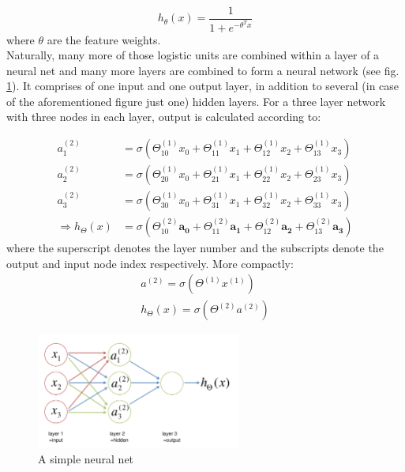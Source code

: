 \documentclass[a4paper, 12pt]{article}
\numberwithin{equation}{section}
\begin{document}
	\begin{equation}
	h_\theta (x) = \frac{1}{1+e^{-\theta ^ T x}}
	\end{equation}
	where $\theta$ are the feature weights.\\
	
	Naturally, many more of those logistic units are combined within a layer of a neural net and many more layers are combined to form a neural network (see fig. \ref{fig:neural_net}). It comprises of one input and one output layer, in addition to several (in case of the aforementioned figure just one) hidden layers. For a three layer network with three nodes in each layer, output is calculated according to:
	
	\begin{align}
	a_1^{(2)} &= \sigma (\Theta_{10}^{(1)} x_0 + \Theta_{11}^{(1)} x_1  + \Theta_{12}^{(1)} x_2  + \Theta_{13}^{(1)} x_3) \\
	a_2^{(2)} &= \sigma (\Theta_{20}^{(1)} x_0 + \Theta_{21}^{(1)} x_1  + \Theta_{22}^{(1)} x_2  + \Theta_{23}^{(1)} x_3) \\
	a_3^{(2)} &= \sigma (\Theta_{30}^{(1)} x_0 + \Theta_{31}^{(1)} x_1  + \Theta_{32}^{(1)} x_2  + \Theta_{33}^{(1)} x_3) \\
	\Rightarrow h_{\Theta} (x) &= \sigma (\Theta_{10}^{(2)} \boldsymbol{a_0} + \Theta_{11}^{(2)} \boldsymbol{a_1}  + \Theta_{12}^{(2)} \boldsymbol{a_2}  + \Theta_{13}^{(2)} \boldsymbol{a_3})
	\end{align}
	where the superscript denotes the layer number and the subscripts denote the output and input node index respectively. More compactly:
	\begin{align}
	a^{(2)} = \sigma(\Theta^{(1)} x^{(1)}) \\
	h_{\Theta}(x) = \sigma(\Theta^{(2)} a^{(2)})
	\end{align}
	
	\begin{figure}[!h]
		\centering
		\includegraphics[page=1,width=0.60\textwidth]{neural_net.pdf}
		\caption{\label{fig:neural_net}{A simple neural net}}
	\end{figure}
	
\end{document}
